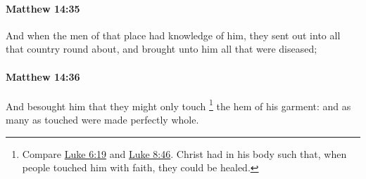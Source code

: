 		\paragraph{Matthew 14:35} %
			\label{MATTHEW-14-35}

			And when the men of that place had knowledge of him, they sent out into all that country round about, and brought unto him all that were diseased;

			\begin{framed}
			\scriptsize
				\begin{compactdesc}
					\item[SBLG] 
				\end{compactdesc}
			\end{framed}

		\paragraph{Matthew 14:36} %
			\label{MATTHEW-14-36}

			And besought him that they might only touch%
				\footnote{%
					Compare \hyperref[LUKE-6-19]{Luke 6:19} and \hyperref[LUKE-8-46]{Luke 8:46}. Christ had  in his body such that, when people touched him with faith, they could be healed.
					}
			the hem of his garment: and as many as touched were made perfectly whole.

